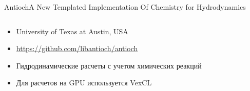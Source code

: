 \documentclass[@BEAMER_OPTIONS@]{beamer}
\newcommand{\www}[1]{\href{#1}{#1}}
\begin{document}
\begin{frame}{Antioch}{A New Templated Implementation Of Chemistry for Hydrodynamics}
    \begin{columns}
        \begin{column}{0.5\textwidth}
            \begin{itemize}
                \item University of Texas at Austin, USA
                \item \www{https://github.com/libantioch/antioch}
                \item Гидродинамические расчеты с учетом химических реакций
                \item Для расчетов на GPU используется VexCL
            \end{itemize}
        \end{column}
        \begin{column}{0.5\textwidth}
            \begin{figure}
            \end{figure}
        \end{column}
    \end{columns}
\end{frame}
\end{document}
